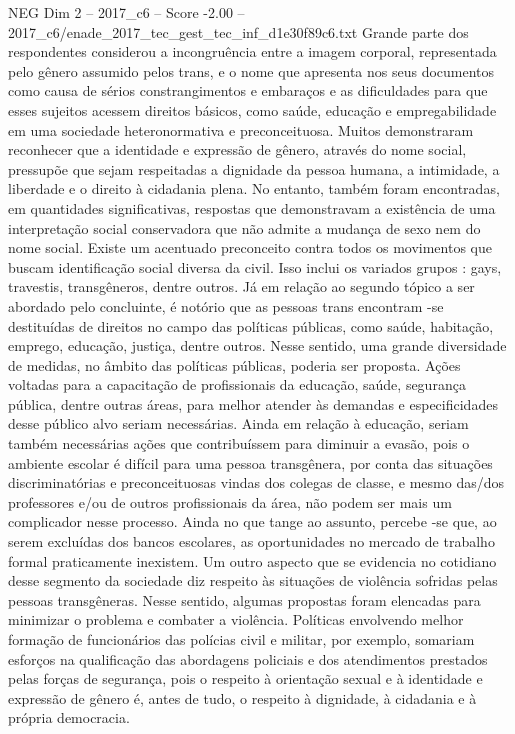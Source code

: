 \begin{textsample}{NEG Dim 2 – 2017\_c6 – Score -2.00 – 2017\_c6/enade\_2017\_tec\_gest\_tec\_inf\_d1e30f89c6.txt}
Grande parte dos respondentes considerou a incongruência entre a imagem corporal, representada pelo gênero assumido pelos trans, e o nome que apresenta nos seus documentos como causa de sérios constrangimentos e embaraços e as dificuldades para que esses sujeitos acessem direitos básicos, como saúde, educação e empregabilidade em uma sociedade heteronormativa e preconceituosa.
Muitos demonstraram reconhecer que a identidade e expressão de gênero, através do nome social, pressupõe que sejam respeitadas a dignidade da pessoa humana, a intimidade, a liberdade e o direito à cidadania plena.
No entanto, também foram encontradas, em quantidades significativas, respostas que demonstravam a existência de uma interpretação social conservadora que não admite a mudança de sexo nem do nome social.
Existe um acentuado preconceito contra todos os movimentos que buscam identificação social diversa da civil.
Isso inclui os variados grupos : gays, travestis, transgêneros, dentre outros.
Já em relação ao segundo tópico a ser abordado pelo concluinte, é notório que as pessoas trans encontram -se destituídas de direitos no campo das políticas públicas, como saúde, habitação, emprego, educação, justiça, dentre outros.
Nesse sentido, uma grande diversidade de medidas, no âmbito das políticas públicas, poderia ser proposta.
Ações voltadas para a capacitação de profissionais da educação, saúde, segurança pública, dentre outras áreas, para melhor atender às demandas e especificidades desse público alvo seriam necessárias.
Ainda em relação à educação, seriam também necessárias ações que contribuíssem para diminuir a evasão, pois o ambiente escolar é difícil para uma pessoa transgênera, por conta das situações discriminatórias e preconceituosas vindas dos colegas de classe, e mesmo das/dos professores e/ou de outros profissionais da área, não podem ser mais um complicador nesse processo.
Ainda no que tange ao assunto, percebe -se que, ao serem excluídas dos bancos escolares, as oportunidades no mercado de trabalho formal praticamente inexistem.
Um outro aspecto que se evidencia no cotidiano desse segmento da sociedade diz respeito às situações de violência sofridas pelas pessoas transgêneras.
Nesse sentido, algumas propostas foram elencadas para minimizar o problema e combater a violência.
Políticas envolvendo melhor formação de funcionários das polícias civil e militar, por exemplo, somariam esforços na qualificação das abordagens policiais e dos atendimentos prestados pelas forças de segurança, pois o respeito à orientação sexual e à identidade e expressão de gênero é, antes de tudo, o respeito à dignidade, à cidadania e à própria democracia.

\end{textsample}

